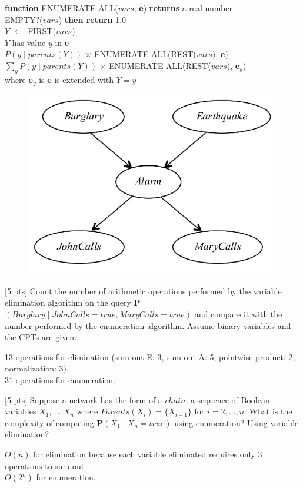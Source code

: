 {\bf function} ENUMERATE-ALL($vars$, {\bf e}) {\bf returns} a real number\\
\indent\hspace{0.5cm}{\bf if} EMPTY?($vars$) {\bf then return} 1.0\\
\indent\hspace{0.5cm}$Y$ $\leftarrow$ FIRST($vars$)\\
\indent\hspace{0.5cm}{\bf if} $Y$ has value $y$ in {\bf e}\\
\indent\hspace{1.0cm}{\bf then return} $P(y \mid parents(Y))$ $\times$ ENUMERATE-ALL(REST($vars$), {\bf e})\\
\indent\hspace{1.0cm}{\bf else return} $\sum\nolimits_y P(y \mid parents(Y))$ $\times$ ENUMERATE-ALL(REST($vars$), {\bf e}$_y$)\\
\indent\hspace{1.5cm}where {\bf e}$_y$ is {\bf e} is extended with $Y = y$\\

\begin{figure}[h]
\centering
\includegraphics[width=0.4\linewidth]{figs/q3_burglary.png}
\end{figure}
\begin{question}{[5 pts]}
Count the number of arithmetic operations performed by the variable elimination algorithm on the query {\bf P}$(Burglary \mid JohnCalls = true, MaryCalls = true)$ and compare it with the number performed by the enumeration algorithm. Assume binary variables and the CPTs are given. 

\end{question}

13 operations for elimination (sum out E: 3, sum out A: 5, pointwise product: 2, normalization: 3). \\
31 operations for enumeration.

\vspace{1.5cm}

\begin{question}{[5 pts]}
Suppose a network has the form of a $chain$: a sequence of Boolean variables $X_1,...,X_n$ where $Parents(X_i) = \{X_{i-1}\}$ for $i=2,...,n$. What is the complexity of computing {\bf P}$(X_1 \mid X_n = true)$ using enumeration? Using variable elimination?
\end{question}
$O(n)$ for elimination because each variable eliminated requires only 3 operations to sum out\\
$O(2^n)$ for enumeration.
\vspace{1.5cm}

